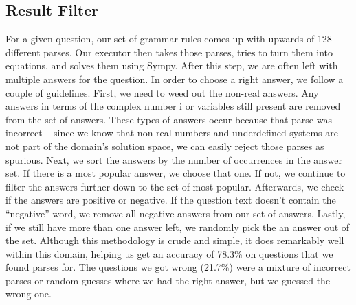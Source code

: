 \documentclass[11pt]{article}
\begin{document}
\subsection{Result Filter}
For a given question, our set of grammar rules comes up with upwards of 128 different parses. Our executor then takes those parses, tries to turn them into equations, and solves them using Sympy. After this step, we are often left with multiple answers for the question. In order to choose a right answer, we follow a couple of guidelines. First, we need to weed out the non-real answers. Any answers in terms of the complex number i or variables still present are removed from the set of answers. These types of answers occur because that parse was incorrect -- since we know that non-real numbers and underdefined systems are not part of the domain’s solution space, we can easily reject those parses as spurious. Next, we sort the answers by the number of occurrences in the answer set. If there is a most popular answer, we choose that one. If not, we continue to filter the answers further down to the set of most popular. Afterwards, we check if the answers are positive or negative. If the question text doesn’t contain the ``negative'' word, we remove all negative answers from our set of answers. Lastly, if we still have more than one answer left, we randomly pick the an answer out of the set.
Although this methodology is crude and simple, it does remarkably well within this domain, helping us get an accuracy of 78.3\% on questions that we found parses for. The questions we got wrong (21.7\%) were a mixture of incorrect parses or random guesses where we had the right answer, but we guessed the wrong one.
\end{document}
